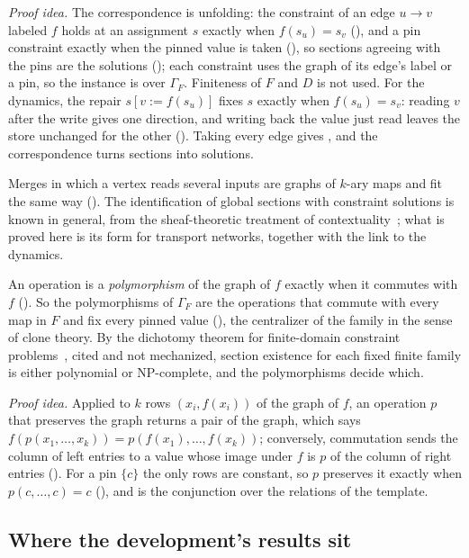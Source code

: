 \emph{Proof idea.} The correspondence is unfolding: the constraint of an edge $u \to v$ labeled $f$ holds
at an assignment $s$ exactly when $f(s_u) = s_v$ (), and a pin constraint exactly when
the pinned value is taken (), so sections agreeing with the pins are the solutions
(); each constraint uses the graph of its edge's label or a pin, so the instance
is over $\Gamma_F$. Finiteness of $F$ and $D$ is not used. For the dynamics, the repair
$s[v := f(s_u)]$ fixes $s$ exactly when $f(s_u) = s_v$: reading $v$ after the write gives one
direction, and writing back the value just read leaves the store unchanged for the other
(). Taking every edge gives , and the correspondence turns
sections into solutions.

Merges in which a vertex reads several inputs are graphs of $k$-ary maps and fit the same way
(). The identification of global sections with constraint solutions is known in
general, from the sheaf-theoretic treatment of contextuality~\cite{abramsky2011,abramsky2014}; what is proved here
is its form for transport networks, together with the link to the dynamics.

An operation is a \emph{polymorphism} of the graph of $f$ exactly when it commutes with $f$
(). So the polymorphisms of $\Gamma_F$ are the operations that commute with every
map in $F$ and fix every pinned value (), the centralizer of the family in the
sense of clone theory. By the dichotomy theorem for finite-domain constraint
problems~\cite{bulatov2017,zhuk2020}, cited and not mechanized, section existence for each fixed
finite family is either polynomial or NP-complete, and the polymorphisms decide which.

\emph{Proof idea.} Applied to $k$ rows $(x_i, f(x_i))$ of the graph of $f$, an operation $p$ that
preserves the graph returns a pair of the graph, which says $f(p(x_1, \dots, x_k)) = p(f(x_1), \dots,
f(x_k))$; conversely, commutation sends the column of left entries to a value whose image under $f$ is $p$ of
the column of right entries (). For a pin $\{c\}$ the only rows are constant, so $p$
preserves it exactly when $p(c, \dots, c) = c$ (), and  is the
conjunction over the relations of the template.

\subsection{Where the development's results sit}

